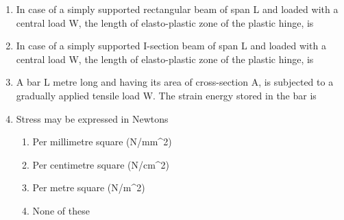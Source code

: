 \documentclass[11pt,a4paper]{article}
\begin{document}
\begin{enumerate}
\item{In case of a simply supported rectangular beam of span L and loaded with a central load W, the length of elasto-plastic zone of the plastic hinge, is}
\\
\item{In case of a simply supported I-section beam of span L and loaded with a central load W, the length of elasto-plastic zone of the plastic hinge, is}
\\
\item{A bar L metre long and having its area of cross-section A, is subjected to a gradually applied tensile load W. The strain energy stored in the bar is}
\\
\item{Stress may be expressed in Newtons}
\begin{enumerate}[label=\Alph*.]
\item{Per millimetre square (N/mm\^{}2)}
\item{Per centimetre square (N/cm\^{}2)}
\item{Per metre square (N/m\^{}2)}
\item{None of these}
\end{enumerate}

\end{enumerate}
\end{document}
